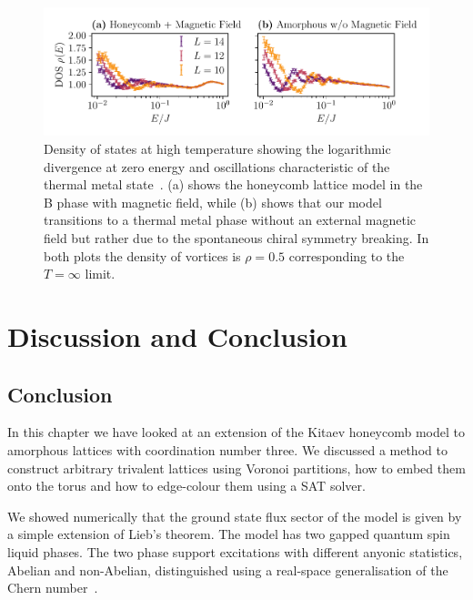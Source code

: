 \hypertarget{fig:DOS_oscillations}{%
\begin{figure}
\centering
\includegraphics[width=1\textwidth,height=\textheight]{figure_code/amk_chapter/results/DOS_oscillations/DOS_oscillations}
\caption[{Distinctive Oscillations in the Density of States}]{Density of states at high temperature showing the logarithmic divergence at zero energy and oscillations characteristic of the thermal metal state~\autocite{bocquet_disordered_2000,selfThermallyInducedMetallic2019}. (a) shows the honeycomb lattice model in the B phase with magnetic field, while (b) shows that our model transitions to a thermal metal phase without an external magnetic field but rather due to the spontaneous chiral symmetry breaking. In both plots the density of vortices is \(\rho = 0.5\) corresponding to the \(T = \infty\) limit.}
\label{fig:DOS_oscillations}
\end{figure}
}

\hypertarget{sec:AMK-Conclusion}{%
\section{Discussion and Conclusion}\label{sec:AMK-Conclusion}}

\hypertarget{conclusion}{%
\subsection{Conclusion}\label{conclusion}}

In this chapter we have looked at an extension of the Kitaev honeycomb model to amorphous lattices with coordination number three. We discussed a method to construct arbitrary trivalent lattices using Voronoi partitions, how to embed them onto the torus and how to edge-colour them using a SAT solver.

We showed numerically that the ground state flux sector of the model is given by a simple extension of Lieb's theorem. The model has two gapped quantum spin liquid phases. The two phase support excitations with different anyonic statistics, Abelian and non-Abelian, distinguished using a real-space generalisation of the Chern number~\autocite{peru_preprint}.

